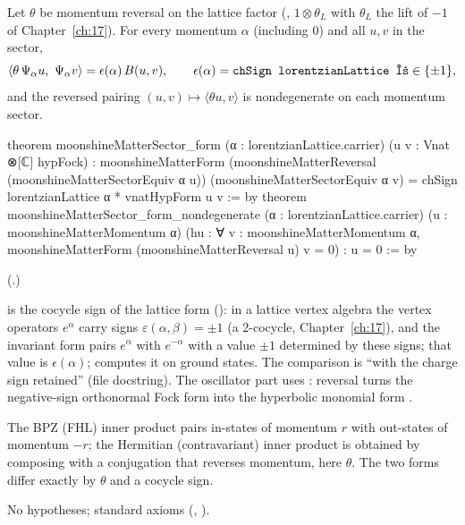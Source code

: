 \begin{theorem}\label{ch18:thm:reversal}
Let $\theta$ be momentum reversal on the lattice factor (, $1\otimes\theta_L$ with $\theta_L$
the lift of $-1$ of Chapter~\ref{ch:17}).  For every momentum $\alpha$ (including $0$) and all $u,v$ in the sector,
\begin{equation*}
  \langle\theta\,\Psi_\alpha u,\ \Psi_\alpha v\rangle=\epsilon(\alpha)\,B(u,v),\qquad \epsilon(\alpha)=\text{\lean{chSign lorentzianLattice α}}\in\{\pm1\},
\end{equation*}
and the reversed pairing $(u,v)\mapsto\langle\theta u,v\rangle$ is nondegenerate on each momentum sector.
\end{theorem}
\begin{leancode}
theorem moonshineMatterSector_form (α : lorentzianLattice.carrier)
    (u v : Vnat ⊗[ℂ] hypFock) :
    moonshineMatterForm
      (moonshineMatterReversal (moonshineMatterSectorEquiv α u))
      (moonshineMatterSectorEquiv α v) =
      chSign lorentzianLattice α * vnatHypForm u v := by
theorem moonshineMatterSector_form_nondegenerate (α : lorentzianLattice.carrier)
    (u : moonshineMatterMomentum α)
    (hu : ∀ v : moonshineMatterMomentum α,
      moonshineMatterForm (moonshineMatterReversal u) v = 0) : u = 0 := by
\end{leancode}
(.)
\begin{dictionary}
 is the cocycle sign of the lattice form (): in a lattice
vertex algebra the vertex operators $e^\alpha$ carry signs $\varepsilon(\alpha,\beta)=\pm1$ (a 2-cocycle, Chapter~\ref{ch:17}), and the
invariant form pairs $e^\alpha$ with $e^{-\alpha}$ with a value $\pm1$ determined by these signs; that value is $\epsilon(\alpha)$;
 computes it on ground states.  The comparison is ``with the charge
sign retained'' (file docstring).  The oscillator part uses : reversal turns the
negative-sign orthonormal Fock form into the hyperbolic monomial form .
\end{dictionary}
\begin{physics}
The BPZ (FHL) inner product pairs in-states of momentum $r$ with out-states of momentum $-r$; the Hermitian
(contravariant) inner product is obtained by composing with a conjugation that reverses momentum, here
$\theta$.  The two forms differ exactly by $\theta$ and a cocycle sign.
\end{physics}
\begin{status}No hypotheses; standard axioms (,
).\end{status}

